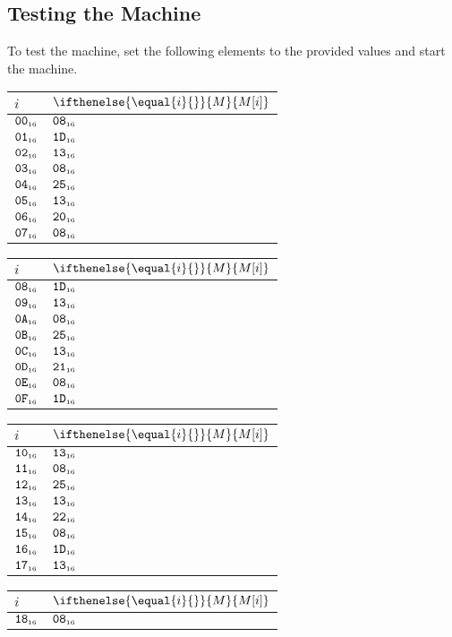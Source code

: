 \documentclass[a4paper,12pt]{article}
\makeatletter
\newcommand{\num}[1]{\texttt{#1}}
\newcommand{\hex}[1]{\num{#1}_{\textup{\tiny 16}}}
\newcommand{\MEM}[1]{\ifthenelse{\equal{#1}{}}{M}{M[#1]}}
\newenvironment{memtable}{%
  \begin{trivlist}
    \item
    }{%
    \end{trivlist}}
\newenvironment{memcolumn}{%
  \begin{tabular}{@{}ll@{}}
    $i$ & $\MEM{i}$ \\
    \hline}
    {%
    \hline
  \end{tabular}}
\newcommand{\memspace}{\qquad}
\makeatother
\begin{document}
\subsection{Testing the Machine}

To test the machine, set the following elements to the provided values and start the machine.

\begin{memtable}
  \begin{memcolumn}
    $\hex{00}$ & $\hex{08}$ \\
    $\hex{01}$ & $\hex{1D}$ \\
    $\hex{02}$ & $\hex{13}$ \\
    $\hex{03}$ & $\hex{08}$ \\
    $\hex{04}$ & $\hex{25}$ \\
    $\hex{05}$ & $\hex{13}$ \\
    $\hex{06}$ & $\hex{20}$ \\
    $\hex{07}$ & $\hex{08}$ \\
  \end{memcolumn}
  \memspace
  \begin{memcolumn}
    $\hex{08}$ & $\hex{1D}$ \\
    $\hex{09}$ & $\hex{13}$ \\
    $\hex{0A}$ & $\hex{08}$ \\
    $\hex{0B}$ & $\hex{25}$ \\
    $\hex{0C}$ & $\hex{13}$ \\
    $\hex{0D}$ & $\hex{21}$ \\
    $\hex{0E}$ & $\hex{08}$ \\
    $\hex{0F}$ & $\hex{1D}$ \\
  \end{memcolumn}
  \memspace
  \begin{memcolumn}
    $\hex{10}$ & $\hex{13}$ \\
    $\hex{11}$ & $\hex{08}$ \\
    $\hex{12}$ & $\hex{25}$ \\
    $\hex{13}$ & $\hex{13}$ \\
    $\hex{14}$ & $\hex{22}$ \\
    $\hex{15}$ & $\hex{08}$ \\
    $\hex{16}$ & $\hex{1D}$ \\
    $\hex{17}$ & $\hex{13}$ \\
  \end{memcolumn}
  \memspace
  \begin{memcolumn}
    $\hex{18}$ & $\hex{08}$ \\

\end{memcolumn}
\end{memtable}
\end{document}

